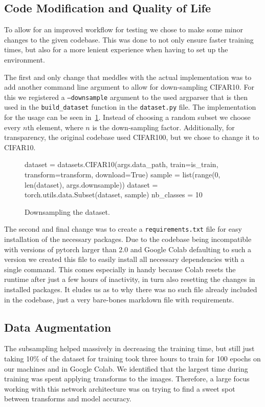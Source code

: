 \documentclass{article}
\begin{document}
\subsection{Code Modification and Quality of Life}\label{subsec:code-modification}
To allow for an improved workflow for testing we chose to make some minor changes to the given codebase.
This was done to not only ensure faster training times, but also for a more lenient experience when having to set up the environment.

The first and only change that meddles with the actual implementation was to add another command line argument to allow for down-sampling CIFAR10.
For this we registered a \texttt{--downsample} argument to the used argparser that is then used in the \verb|build_dataset| function in the \texttt{dataset.py} file.
The implementation for the usage can be seen in~\ref{fig:downsampling}.
Instead of choosing a random subset we choose every $n$th element, where $n$ is the down-sampling factor.
Additionally, for transparency, the original codebase used CIFAR100, but we chose to change it to CIFAR10.
\begin{figure}[h]
    \begin{python}
dataset = datasets.CIFAR10(args.data_path, train=is_train,
transform=transform, download=True)
sample = list(range(0, len(dataset), args.downsample))
dataset = torch.utils.data.Subset(dataset, sample)
nb_classes = 10
    \end{python}
    \caption{Downsampling the dataset.}
    \label{fig:downsampling}
\end{figure}

The second and final change was to create a \texttt{requirements.txt} file for easy installation of the necessary packages.
Due to the codebase being incompatible with versions of pytorch larger than 2.0 and Google Colab defaulting to such a version we created this file to easily install all necessary dependencies with a single command.
This comes especially in handy because Colab resets the runtime after just a few hours of inactivity, in turn also resetting the changes in installed packages.
It eludes us as to why there was no such file already included in the codebase, just a very bare-bones markdown file with requirements.

\subsection{Data Augmentation}\label{subsec:data-augmentation}
The subsampling helped massively in decreasing the training time, but still just taking 10\% of the dataset for training took three hours to train for 100 epochs on our machines and in Google Colab.
We identified that the largest time during training was spent applying transforms to the images.
Therefore, a large focus working with this network architecture was on trying to find a sweet spot between transforms and model accuracy.
\end{document}
